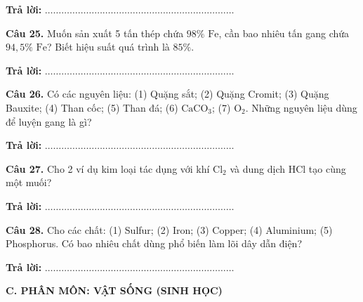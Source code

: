 \documentclass{article}
\begin{document}
\textbf{Trả lời:} $\dots\dots\dots\dots\dots\dots\dots\dots\dots\dots\dots\dots\dots\dots\dots\dots\dots\dots\dots\dots\dots\dots\dots$
\vspace*{\fill}
\newpage

\fontsize{26}{34}\selectfont
\textbf{Câu 25.} Muốn sản xuất 5 tấn thép chứa $98\%\text{ Fe}$, cần bao nhiêu tấn gang chứa $94{,}5\%\text{ Fe}$? Biết hiệu suất quá trình là $85\%$.
\vspace{8pt}

\textbf{Trả lời:} $\dots\dots\dots\dots\dots\dots\dots\dots\dots\dots\dots\dots\dots\dots\dots\dots\dots\dots\dots\dots\dots\dots\dots$

\vspace*{\fill}

\textbf{Câu 26.} Có các nguyên liệu: (1) Quặng sắt; (2) Quặng Cromit; (3) Quặng Bauxite; (4) Than cốc; (5) Than đá; (6) $\text{CaCO}_3$; (7) $\text{O}_2$. Những nguyên liệu dùng để luyện gang là gì?
\vspace{8pt}

\textbf{Trả lời:} $\dots\dots\dots\dots\dots\dots\dots\dots\dots\dots\dots\dots\dots\dots\dots\dots\dots\dots\dots\dots\dots\dots\dots$
\vspace*{\fill}
\newpage

\fontsize{26}{34}\selectfont
\textbf{Câu 27.} Cho 2 ví dụ kim loại tác dụng với khí $\text{Cl}_2$ và dung dịch $\text{HCl}$ tạo cùng một muối?
\vspace{8pt}

\textbf{Trả lời:} $\dots\dots\dots\dots\dots\dots\dots\dots\dots\dots\dots\dots\dots\dots\dots\dots\dots\dots\dots\dots\dots\dots\dots$

\vspace*{\fill}

\textbf{Câu 28.} Cho các chất: (1) Sulfur; (2) Iron; (3) Copper; (4) Aluminium; (5) Phosphorus. Có bao nhiêu chất dùng phổ biến làm lõi dây dẫn điện?
\vspace{8pt}

\textbf{Trả lời:} $\dots\dots\dots\dots\dots\dots\dots\dots\dots\dots\dots\dots\dots\dots\dots\dots\dots\dots\dots\dots\dots\dots\dots$
\vspace*{\fill}
\newpage

\fontsize{28}{36}\selectfont
\textbf{\color{brandGreen}C. PHÂN MÔN: VẬT SỐNG (SINH HỌC)}
\vspace{10pt}
\end{document}
